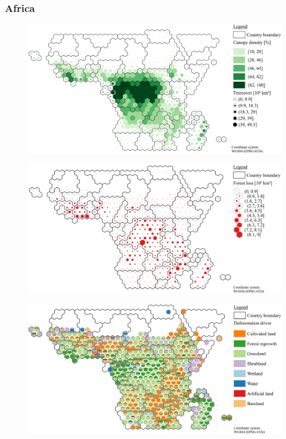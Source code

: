 		\subsubsection{Africa}
			\begin{figure}[ht]
				\centering
				\includegraphics[scale=1]{img/africa_treecover_frameless}
				\caption[Ecosystem service values]{}
				\label{fig:africacover}
			\end{figure}
			\begin{figure}[ht]
				\centering
				\includegraphics[scale=1]{img/africa_loss_frameless}
				\caption[Ecosystem service values]{}
				\label{fig:africaloss}
			\end{figure}
			\begin{figure}[ht]
				\centering
				\includegraphics[scale=1]{img/africa_driver_frameless}
				\caption[Ecosystem service values]{}
				\label{fig:africadriver}
			\end{figure}

